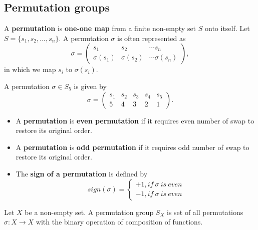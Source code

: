 \begin{refsection}
\subsection{Permutation groups}

\begin{definition}[permutation]\cite[277]{banerjee2014linear}
	A \textbf{permutation} is \textbf{one-one map }from a finite non-empty set $S$ onto itself. Let $S=\{s_1,s_2,...,s_n\}$. A permutation $\sigma$ is often represented as 
	$$\sigma = \begin{pmatrix}
	s_1 & s_2 & \cdots s_n\\
	\sigma(s_1) & \sigma(s_2) &\cdots \sigma(s_n)
	\end{pmatrix},$$
	in which we map $s_i$ to $\sigma(s_i)$.	
\end{definition}

\begin{example}
A permutation $\sigma \in S_5$ is given by
	$$\sigma = \begin{pmatrix}
	s_1 & s_2 & s_3 & s_4 & s_5\\
	5 & 4 & 3 & 2 & 1
	\end{pmatrix}.$$
\end{example}

\begin{definition}\cite[278]{banerjee2014linear}\hfill
	\begin{itemize}
		\item A \textbf{permutation} is \textbf{even permutation} if it requires even number of swap to restore its original order. 
		\item A \textbf{permutation} is \textbf{odd permutation} if it requires odd number of swap to restore its original order. 
		\item The \textbf{sign of a permutation} is defined by
		$$sign(\sigma) = \begin{cases*}
		+1, if~ \sigma~ is~ even\\
		-1, if~ \sigma~ is~ even
		\end{cases*}$$ 
	\end{itemize}		
\end{definition}


\begin{definition}
	\cite[26]{krim2015geometric}Let $X$ be a non-empty set. A permutation group $S_X$ is set of all permutations $\sigma:X\to X$ with the binary operation of composition of functions.
\end{definition}



\end{refsection}

